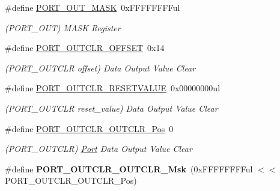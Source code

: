 \begin{DoxyCompactItemize}
\item 
\hypertarget{group___s_a_m_l21___p_o_r_t_ga14d208ae2f33fb3a123593bc0ee91b5c}{}\#define \hyperlink{group___s_a_m_l21___p_o_r_t_ga14d208ae2f33fb3a123593bc0ee91b5c}{P\+O\+R\+T\+\_\+\+O\+U\+T\+\_\+\+M\+A\+S\+K}~0x\+F\+F\+F\+F\+F\+F\+F\+Ful\label{group___s_a_m_l21___p_o_r_t_ga14d208ae2f33fb3a123593bc0ee91b5c}

\begin{DoxyCompactList}\small\item\em (P\+O\+R\+T\+\_\+\+O\+U\+T) M\+A\+S\+K Register \end{DoxyCompactList}\item 
\hypertarget{group___s_a_m_l21___p_o_r_t_gabfa9579bd1cebd85dc745bfd430a6453}{}\#define \hyperlink{group___s_a_m_l21___p_o_r_t_gabfa9579bd1cebd85dc745bfd430a6453}{P\+O\+R\+T\+\_\+\+O\+U\+T\+C\+L\+R\+\_\+\+O\+F\+F\+S\+E\+T}~0x14\label{group___s_a_m_l21___p_o_r_t_gabfa9579bd1cebd85dc745bfd430a6453}

\begin{DoxyCompactList}\small\item\em (P\+O\+R\+T\+\_\+\+O\+U\+T\+C\+L\+R offset) Data Output Value Clear \end{DoxyCompactList}\item 
\hypertarget{group___s_a_m_l21___p_o_r_t_gad9e9f2f4052c8c9a19937ade97602106}{}\#define \hyperlink{group___s_a_m_l21___p_o_r_t_gad9e9f2f4052c8c9a19937ade97602106}{P\+O\+R\+T\+\_\+\+O\+U\+T\+C\+L\+R\+\_\+\+R\+E\+S\+E\+T\+V\+A\+L\+U\+E}~0x00000000ul\label{group___s_a_m_l21___p_o_r_t_gad9e9f2f4052c8c9a19937ade97602106}

\begin{DoxyCompactList}\small\item\em (P\+O\+R\+T\+\_\+\+O\+U\+T\+C\+L\+R reset\+\_\+value) Data Output Value Clear \end{DoxyCompactList}\item 
\hypertarget{group___s_a_m_l21___p_o_r_t_gaa448fb60871992079921f4c31b2ab0a0}{}\#define \hyperlink{group___s_a_m_l21___p_o_r_t_gaa448fb60871992079921f4c31b2ab0a0}{P\+O\+R\+T\+\_\+\+O\+U\+T\+C\+L\+R\+\_\+\+O\+U\+T\+C\+L\+R\+\_\+\+Pos}~0\label{group___s_a_m_l21___p_o_r_t_gaa448fb60871992079921f4c31b2ab0a0}

\begin{DoxyCompactList}\small\item\em (P\+O\+R\+T\+\_\+\+O\+U\+T\+C\+L\+R) \hyperlink{struct_port}{Port} Data Output Value Clear \end{DoxyCompactList}\item 
\hypertarget{group___s_a_m_l21___p_o_r_t_gaece9af6cd305c4d43772a0fbd4288de2}{}\#define {\bfseries P\+O\+R\+T\+\_\+\+O\+U\+T\+C\+L\+R\+\_\+\+O\+U\+T\+C\+L\+R\+\_\+\+Msk}~(0x\+F\+F\+F\+F\+F\+F\+F\+Ful $<$$<$ P\+O\+R\+T\+\_\+\+O\+U\+T\+C\+L\+R\+\_\+\+O\+U\+T\+C\+L\+R\+\_\+\+Pos)\label{group___s_a_m_l21___p_o_r_t_gaece9af6cd305c4d43772a0fbd4288de2}


\end{DoxyCompactItemize}

